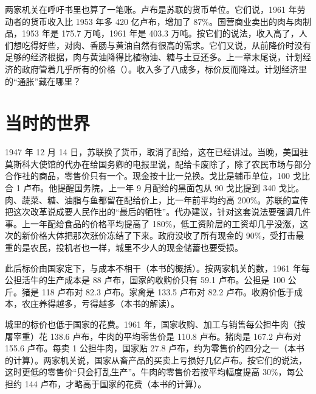两家机关在呼吁书里也算了一笔账。卢布是苏联的货币单位。它们说，1961 年劳动者的货币收入比 1953 年多 420 亿卢布，增加了 87\%\cite{zv1962}。国营商业卖出的肉与肉制品，1953 年是 175.7 万吨，1961 年是 403.3 万吨\cite{zv1962}。按它们的说法，收入高了，人们想吃得好些，对肉、香肠与黄油自然有很高的需求\cite{zv1962}。它们又说，从前降价时没有足够的经济根据，肉与黄油降得比植物油、糖与土豆还多\cite{zv1962}。上一章末尾说，计划经济的政府管着几乎所有的价格（）。收入多了八成多，标价反而降过。计划经济里的“通胀”藏在哪里？

\section{当时的世界}\label{sec:planned-world}

1947 年 12 月 14 日，苏联换了货币，取消了配给，这在已经讲过。当晚，美国驻莫斯科大使馆的代办在给国务卿的电报里说，配给卡废除了，除了农民市场与部分合作社的商品，零售价只有一个\cite{frus1947}。现金按十比一兑换\cite{frus1947}。戈比是辅币单位，100 戈比合 1 卢布。他提醒国务院，上一年 9 月配给的黑面包从 90 戈比提到 340 戈比\cite{frus1947}。肉、蔬菜、糖、油脂与鱼都留在配给价上，比一年前平均约高 200\%\cite{frus1947}。苏联的宣传把这次改革说成要人民作出的“最后的牺牲”\cite{frus1947}。代办建议，针对这套说法要强调几件事。上一年配给食品的价格平均提高了 180\%，低工资阶层的工资却几乎没涨，这次的新价格大体把那次涨价冻结了下来\cite{frus1947}。政府没收了所有现金的 90\%，受打击最重的是农民，投机者也一样，城里不少人的现金储蓄也要受损\cite{frus1947}。

此后标价由国家定下，与成本不相干（本书的概括）。按两家机关的数，1961 年每公担活牛的生产成本是 88 卢布，国家的收购价只有 59.1 卢布\cite{zv1962}。公担是 100 公斤。猪是 118 卢布对 82.3 卢布\cite{zv1962}。家禽是 133.5 卢布对 82.2 卢布\cite{zv1962}。收购价低于成本，农庄养得越多，亏得越多（本书的解读）。

城里的标价也低于国家的花费。1961 年，国家收购、加工与销售每公担牛肉（按屠宰重）花 138.6 卢布，牛肉的平均零售价是 110.8 卢布\cite{zv1962}。猪肉是 167.2 卢布对 155.6 卢布\cite{zv1962}。每卖 1 公担牛肉，国家贴 27.8 卢布，约为零售价的四分之一（本书的计算）。两家机关说，国家从畜产品的买卖上亏损好几亿卢布\cite{zv1962}。按它们的说法，这时更低的零售价“只会打乱生产”\cite{zv1962}。牛肉的零售价若按平均幅度提高 30\%，每公担约 144 卢布，才略高于国家的花费（本书的计算）。


